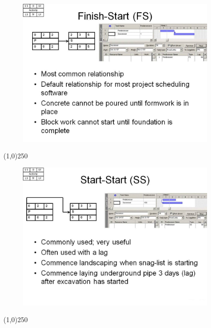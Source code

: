 \begin{frame}
\begin{figure}
	\centering
		\includegraphics[width = 10.0cm]{oldnotes/Slide176.jpg}
\end{figure}
\end{frame}
\begin{center}\line(1,0){250}\end{center}




\begin{frame}
\begin{figure}
	\centering
		\includegraphics[width = 10.0cm]{oldnotes/Slide177.jpg}
\end{figure}
\end{frame}
\begin{center}\line(1,0){250}\end{center}




